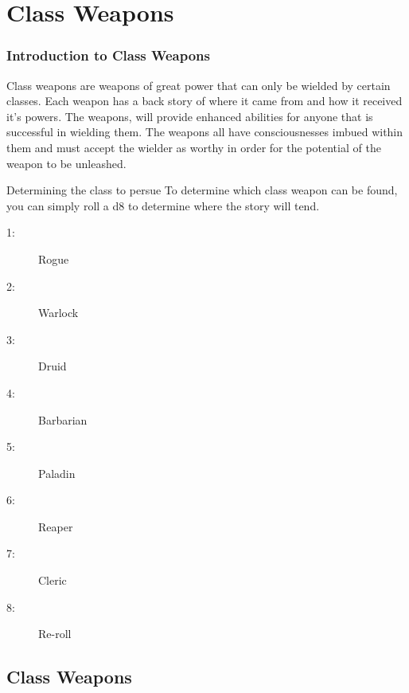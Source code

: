 \chapter{Class Weapons} \label{Weapons}

\subsection{Introduction to Class Weapons}

Class weapons are weapons of great power that can only be wielded by certain classes. Each weapon has a back story of where it came from and how it received it's powers. The weapons, will provide enhanced abilities for anyone that is successful in wielding them. The weapons all have consciousnesses imbued within them and must accept the wielder as worthy in order for the potential of the weapon to be unleashed. 

\begin{commentbox}{Determining the class to persue}
	To determine which class weapon can be found, you can simply roll a d8 to determine where the story will tend.
	\hline
	\begin{multicols}{4}
		\begin{description}
			\item[1:] Rogue 
			\item[2:] Warlock
			\item[3:] Druid
			\item[4:] Barbarian
			\item[5:] Paladin
			\item[6:] Reaper
			\item[7:] Cleric
			\item[8:] Re-roll
		\end{description}
	\end{multicols}
\end{commentbox}

\section{Class Weapons}

















